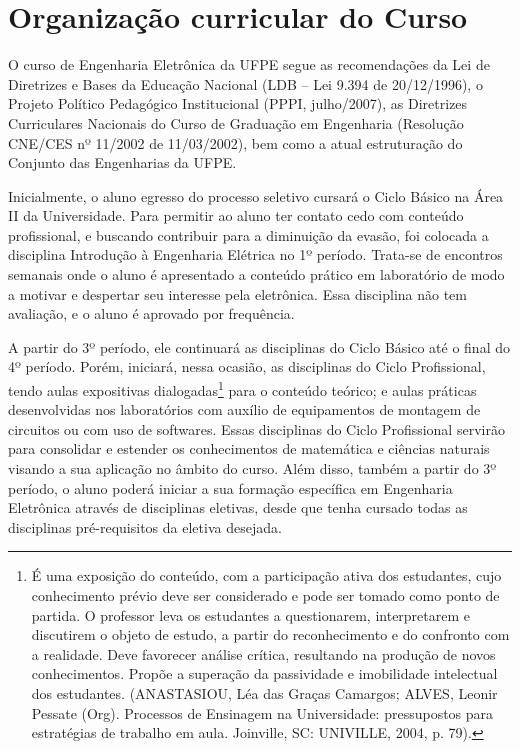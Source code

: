 \chapter{Organização curricular do Curso}
\label{cap11}

O curso de Engenharia Eletrônica da UFPE segue as recomendações da Lei de Diretrizes e Bases da Educação Nacional (LDB – Lei 9.394 de 20/12/1996), o Projeto Político Pedagógico Institucional (PPPI, julho/2007), as Diretrizes Curriculares Nacionais do Curso de Graduação em Engenharia (Resolução CNE/CES nº 11/2002 de 11/03/2002), bem como a atual estruturação do Conjunto das Engenharias da UFPE.

Inicialmente, o aluno egresso do processo seletivo cursará o Ciclo Básico na Área II da Universidade. Para permitir ao aluno ter contato cedo com conteúdo profissional, e buscando contribuir para a diminuição da evasão, foi colocada a disciplina Introdução à Engenharia Elétrica no 1º período. Trata-se de encontros semanais onde o aluno é apresentado a conteúdo prático em laboratório de modo a motivar e despertar seu interesse pela eletrônica. Essa disciplina não tem avaliação, e o aluno é aprovado por frequência. 

A partir do 3º período, ele continuará as disciplinas do Ciclo Básico até o final do 4º período. Porém, iniciará, nessa ocasião, as disciplinas do Ciclo Profissional, tendo aulas expositivas dialogadas\footnote[6]{É uma exposição do conteúdo, com a participação ativa dos estudantes, cujo conhecimento prévio deve ser considerado e pode ser tomado como ponto de partida. O professor leva os estudantes a questionarem, interpretarem e discutirem o objeto de estudo, a partir do reconhecimento e do confronto com a realidade. Deve favorecer análise crítica, resultando na produção de novos conhecimentos. Propõe a superação da passividade e imobilidade intelectual dos estudantes. (ANASTASIOU, Léa das Graças Camargos; ALVES, Leonir Pessate (Org). Processos de Ensinagem na Universidade: pressupostos para estratégias de trabalho em aula. Joinville, SC: UNIVILLE, 2004, p. 79).} para o conteúdo teórico; e aulas práticas desenvolvidas nos laboratórios com auxílio de equipamentos de montagem de circuitos ou com uso de softwares. Essas disciplinas do Ciclo Profissional servirão para consolidar e estender os conhecimentos de matemática e ciências naturais visando a sua aplicação no âmbito do curso. Além disso, também a partir do 3º período, o aluno poderá iniciar a sua formação específica em Engenharia Eletrônica através de disciplinas eletivas, desde que tenha cursado todas as disciplinas pré-requisitos da eletiva desejada.

